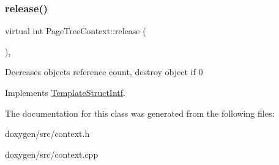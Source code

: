 \mbox{\label{class_page_tree_context_ae55145312b83e56e57c3e59311d788c2}} 
\subsubsection{\texorpdfstring{release()}{release()}}
{\footnotesize\ttfamily virtual int Page\+Tree\+Context\+::release (\begin{DoxyParamCaption}{ }\end{DoxyParamCaption})\hspace{0.3cm}{\ttfamily [inline]}, {\ttfamily [virtual]}}

Decreases object\textquotesingle{}s reference count, destroy object if 0 

Implements \mbox{\hyperlink{class_template_struct_intf_a3dce7dd29d3f66a8080b40578e8a5045}{Template\+Struct\+Intf}}.



The documentation for this class was generated from the following files\+:\begin{DoxyCompactItemize}
\item 
doxygen/src/context.\+h\item 
doxygen/src/context.\+cpp\end{DoxyCompactItemize}
